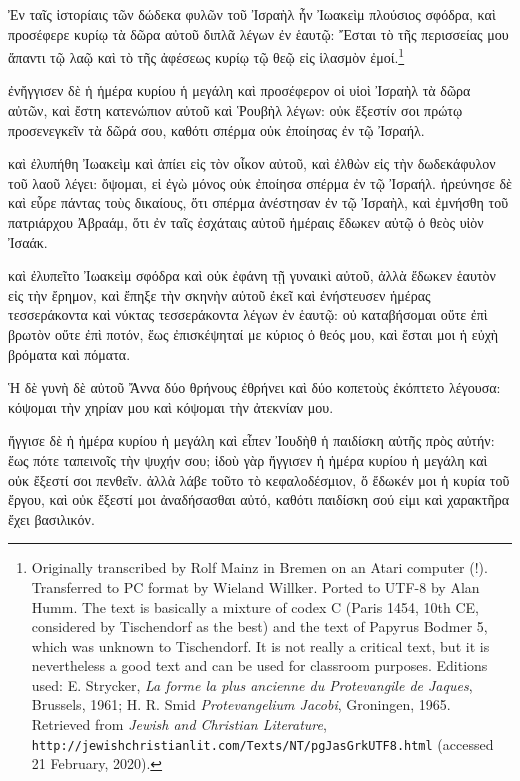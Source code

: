 \pstart
{}

\pend\setcounter{pstartL}{1}\pstart
Ἐν ταῖς ἱστορίαις τῶν δώδεκα φυλῶν τοῦ Ἰσραὴλ ἦν Ἰωακεὶμ πλούσιος σφόδρα, καὶ προσέφερε κυρίῳ τὰ δῶρα αὐτοῦ διπλᾶ λέγων ἐν ἑαυτῷ: Ἔσται τὸ τῆς περισσείας μου ἅπαντι τῷ λαῷ καὶ τὸ τῆς ἀφέσεως κυρίῳ τῷ θεῷ εἰς ἱλασμὸν ἐμοί.\footnote{Originally transcribed by Rolf Mainz in Bremen on an Atari computer (!). Transferred to PC format by Wieland Willker. Ported to UTF-8 by Alan Humm. The text is basically a mixture of codex C (Paris 1454, 10th CE, considered by Tischendorf as the best) and the text of Papyrus Bodmer 5, which was unknown to Tischendorf. It is not really a critical text, but it is nevertheless a good text and can be used for classroom purposes. Editions used: E. Strycker, \textit{La forme la plus ancienne du Protevangile de Jaques}, Brussels, 1961; H. R. Smid \textit{Protevangelium Jacobi}, Groningen, 1965. Retrieved from \textit{Jewish and Christian Literature}, \texttt{http://jewishchristianlit.com/Texts/NT/pgJasGrkUTF8.html} (accessed 21 February, 2020).}

\pend\pstart
ἐνἤγγισεν δὲ ἡ ἡμέρα κυρίου ἡ μεγάλη καὶ προσέφερον οἱ υἱοὶ Ἰσραὴλ τὰ δῶρα αὐτῶν, καὶ ἔστη κατενώπιον αὐτοῦ καὶ Ῥουβὴλ λέγων: οὐκ ἔξεστίν σοι πρώτῳ προσενεγκεῖν τὰ δῶρά σου, καθότι σπέρμα οὐκ ἐποίησας ἐν τῷ Ἰσραήλ.

\pend\pstart
καὶ ἐλυπήθη Ἰωακεὶμ καὶ ἀπίει εἰς τὸν οἶκον αὐτοῦ, καὶ ἐλθὼν εἰς τὴν δωδεκάφυλον τοῦ λαοῦ λέγει: ὄψομαι, εἰ ἐγὼ μόνος οὐκ ἐποίησα σπέρμα ἐν τῷ Ἰσραήλ. ἠρεύνησε δὲ καὶ εὗρε πάντας τοὺς δικαίους, ὅτι σπέρμα ἀνέστησαν ἐν τῷ Ἰσραὴλ, καὶ ἐμνήσθη τοῦ πατριάρχου Ἀβραάμ, ὅτι ἐν ταῖς ἐσχάταις αὐτοῦ ἡμέραις ἔδωκεν αὐτῷ ὁ θεὸς υἱὸν Ἰσαάκ.

\pend\pstart
καὶ ἐλυπεῖτο Ἰωακεὶμ σφόδρα καὶ οὐκ ἐφάνη τῇ γυναικὶ αὐτοῦ, ἀλλὰ ἔδωκεν ἑαυτὸν εἰς τὴν ἔρημον, καὶ ἔπηξε τὴν σκηνὴν αὐτοῦ ἐκεῖ καὶ ἐνήστευσεν ἡμέρας τεσσεράκοντα καὶ νύκτας τεσσεράκοντα λέγων ἑν ἑαυτῷ: οὐ καταβήσομαι οὔτε ἐπὶ βρωτὸν οὔτε ἐπὶ ποτόν, ἕως ἐπισκέψηταί με κύριος ὁ θεός μου, καὶ ἔσται μοι ἡ εὐχὴ βρόματα καὶ πόματα.

\pend\pstart
{}

\pend\setcounter{pstartL}{1}\pstart
Ἡ δὲ γυνὴ δὲ αὐτοῦ Ἄννα δύο θρήνους ἐθρήνει καὶ δύο κοπετοὺς ἐκόπτετο λέγουσα: κόψομαι τὴν χηρίαν μου καὶ κόψομαι τὴν ἀτεκνίαν μου.

\pend\pstart
ἤγγισε δὲ ἡ ἡμέρα κυρίου ἡ μεγάλη καὶ εἶπεν Ἰουδὴθ ἡ παιδίσκη αὐτῆς πρὸς αὐτήν: ἕως πότε ταπεινοῖς τὴν ψυχήν σου; ἰδοὺ γὰρ ἤγγισεν ἡ ἡμέρα κυρίου ἡ μεγάλη καὶ οὐκ ἔξεστί σοι πενθεῖν. ἀλλὰ λάβε τοῦτο τὸ κεφαλοδέσμιον, ὅ ἔδωκέν μοι ἡ κυρία τοῦ ἔργου, καὶ οὐκ ἔξεστί μοι ἀναδήσασθαι αὐτό, καθότι παιδίσκη σού εἰμι καὶ χαρακτῆρα ἔχει βασιλικόν.

